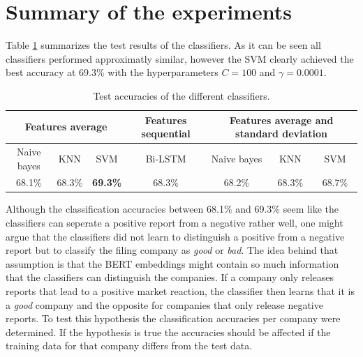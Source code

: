 \section{Summary of the experiments}
Table \ref{table:test_results} summarizes the test results of the classifiers.
As it can be seen all classifiers performed approximatly similar, however the \ac{SVM} clearly achieved the best accuracy at 69.3\% with the hyperparameters $C=100$ and $\gamma=0.0001$.
\begin{table}[h]
    \begin{tabular}{ c | c | c || c || c | c | c }
        \multicolumn{3}{c||}{Features average} & Features sequential & \multicolumn{3}{c}{Features average and standard deviation} \\ \hline
        Naive bayes & KNN & SVM & Bi-LSTM & Naive bayes & KNN & SVM \\ \hline
        68.1\% & 68.3\% & \textbf{69.3\%} & 68.3\% & 68.2\% & 68.3\% & 68.7\% 
    \end{tabular}
    \caption{Test accuracies of the different classifiers.}
    \label{table:test_results}
\end{table}
Although the classification accuracies between 68.1\% and 69.3\% seem like the classifiers can seperate a positive report from a negative rather well, one might argue that the classifiers did not learn to distinguish a positive from a negative report but to classify the filing company as \textit{good} or \textit{bad}.
The idea behind that assumption is that the \ac{BERT} embeddings might contain so much information that the classifiers can distinguish the companies.
If a company only releases reports that lead to a positive market reaction, the classifier then learns that it is a \textit{good} company and the opposite for companies that only release negative reports.
To test this hypothesis the classification accuracies per company were determined.
If the hypothesis is true the accuracies should be affected if the training data for that company differs from the test data.
